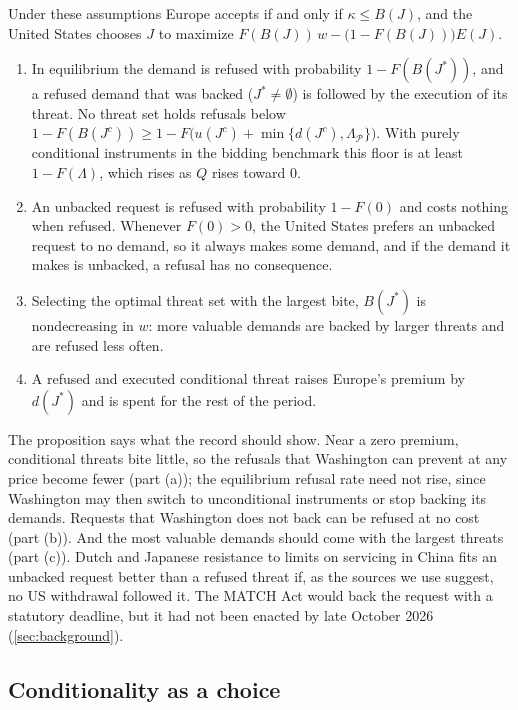 \begin{proposition}\label{prop:refusal}
Under these assumptions Europe accepts if and only if $\kappa\le B(J)$, and the United States chooses $J$ to maximize $F(B(J))\,w-\big(1-F(B(J))\big)E(J)$.
\begin{enumerate}[label=(\alph*)]
\item In equilibrium the demand is refused with probability $1-F(B(J^*))$, and a refused demand that was backed ($J^*\neq\emptyset$) is followed by the execution of its threat. No threat set holds refusals below $1-F(B(J^c))\ge 1-F\big(u(J^c)+\min\{d(J^c),\Lambda_{\mathcal P}\}\big)$. With purely conditional instruments in the bidding benchmark this floor is at least $1-F(\Lambda)$, which rises as $Q$ rises toward $0$.
\item An unbacked request is refused with probability $1-F(0)$ and costs nothing when refused. Whenever $F(0)>0$, the United States prefers an unbacked request to no demand, so it always makes some demand, and if the demand it makes is unbacked, a refusal has no consequence.
\item Selecting the optimal threat set with the largest bite, $B(J^*)$ is nondecreasing in $w$: more valuable demands are backed by larger threats and are refused less often.
\item A refused and executed conditional threat raises Europe's premium by $d(J^*)$ and is spent for the rest of the period.
\end{enumerate}
\end{proposition}

The proposition says what the record should show. Near a zero premium, conditional threats bite little, so the refusals that Washington can prevent at any price become fewer (part (a)); the equilibrium refusal rate need not rise, since Washington may then switch to unconditional instruments or stop backing its demands. Requests that Washington does not back can be refused at no cost (part (b)). And the most valuable demands should come with the largest threats (part (c)). Dutch and Japanese resistance to limits on servicing in China fits an unbacked request better than a refused threat if, as the sources we use suggest, no US withdrawal followed it. The MATCH Act would back the request with a statutory deadline, but it had not been enacted by late October 2026 (\cref{sec:background}).

\subsection{Conditionality as a choice}\label{sec:conditionality}

